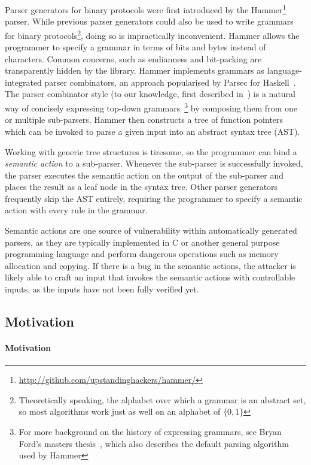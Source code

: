 Parser generators for binary protocols were first introduced by the
Hammer\footnote{\url{http://github.com/upstandinghackers/hammer/}} parser.
While previous parser generators could also be used to write grammars
for binary protocols\footnote{Theoretically speaking, the alphabet
over which a grammar is an  abstract set, so most algorithms work
just as well on an alphabet of $\{0,1\}$}, doing so is impractically
inconvenient. Hammer allows the programmer to specify a grammar in
terms of bits and bytes instead of characters. Common concerns, such as
endianness and bit-packing are transparently hidden by the library. Hammer
implements grammars as language-integrated parser combinators, an approach
popularised by Parsec for Haskell~\cite{LeijenMeijer:parsec}. The
parser combinator style (to our knowledge, first  described
in~\cite{burge1975recursive}) is a natural way of concisely expressing
top-down grammars~\cite{Danielsson:2010:TPC:1863543.1863585}\footnote{For
more background on the history of expressing grammars, see Bryan Ford's
masters thesis~\cite{ford2002packrat}, which also describes the default
parsing algorithm used by Hammer} by composing them from one or multiple
sub-parsers.  Hammer then constructs a tree of function pointers which
can be invoked to parse a given input into an abstract syntax tree (AST).

Working with generic tree structures is tiresome, so the programmer can
bind a \textit{semantic action} to a sub-parser. Whenever the sub-parser
is successfully invoked, the parser executes the semantic action on the
output of the sub-parser and places the result as a leaf node in the
syntax tree. Other parser generators frequently skip the AST entirely,
requiring the programmer to specify a semantic action with every rule
in the grammar.

Semantic actions are one source of vulnerability within automatically
generated parsers, as they are typically implemented in C or another
general purpose programming language and perform dangerous operations
such as memory allocation and copying. If there is a bug in the semantic
actions, the attacker is likely able to craft an input that invokes the
semantic actions with controllable inputs, as the inputs have not been
fully verified yet.

\subsection{Motivation}

\paragraph{Motivation}

